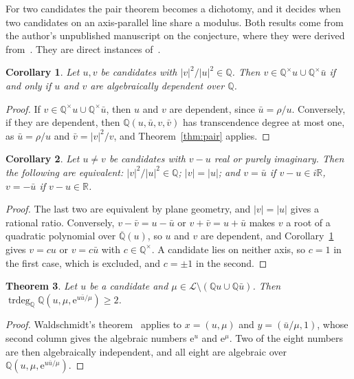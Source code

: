 \documentclass[11pt,a4paper]{article}
\theoremstyle{plain}
\newtheorem{theorem}{Theorem}[section]
\newtheorem{corollary}[theorem]{Corollary}
\theoremstyle{definition}
\newcommand{\e}{\mathrm{e}}
\newcommand{\Q}{\mathbb{Q}}
\newcommand{\R}{\mathbb{R}}
\newcommand{\Alg}{\overline{\mathbb{Q}}}
\newcommand{\Logs}{\mathcal{L}}
\DeclareMathOperator{\trdeg}{trdeg}
\begin{document}
For two candidates the pair theorem becomes a dichotomy, and it decides when two candidates on an
axis-parallel line share a modulus. Both results come from the author's unpublished manuscript on the
conjecture, where they were derived from~\cite[Th\'eor\`eme~0.2]{roy-waldschmidt-1997}. They are direct
instances of~\cite[Corollaire~4]{waldschmidt-1973}.

\begin{corollary}\label{cor:pair-dichotomy}
Let $u,v$ be candidates with $|v|^{2}/|u|^{2}\in\Q$. Then $v\in\Q^{\times}u\cup\Q^{\times}\bar u$ if and
only if $u$ and $v$ are algebraically dependent over $\Q$.
\end{corollary}

\begin{proof}
If $v\in\Q^{\times}u\cup\Q^{\times}\bar u$, then $u$ and $v$ are dependent, since $\bar u=\rho/u$.
Conversely, if they are dependent, then $\Q(u,\bar u,v,\bar v)$ has transcendence degree at most one,
as $\bar u=\rho/u$ and $\bar v=|v|^{2}/v$, and Theorem~\ref{thm:pair} applies.
\end{proof}

\begin{corollary}\label{cor:axis-ratio}
Let $u\neq v$ be candidates with $v-u$ real or purely imaginary. Then the following are equivalent:
$|v|^{2}/|u|^{2}\in\Q$; $|v|=|u|$; and $v=\bar u$ if $v-u\in i\R$, $v=-\bar u$ if $v-u\in\R$.
\end{corollary}

\begin{proof}
The last two are equivalent by plane geometry, and $|v|=|u|$ gives a rational ratio. Conversely,
$v-\bar v=u-\bar u$ or $v+\bar v=u+\bar u$ makes $v$ a root of a quadratic polynomial over $\Alg(u)$, so
$u$ and $v$ are dependent, and Corollary~\ref{cor:pair-dichotomy} gives $v=cu$ or $v=c\bar u$ with
$c\in\Q^{\times}$. A candidate lies on neither axis, so $c=1$ in the first case, which is excluded,
and $c=\pm1$ in the second.
\end{proof}

\begin{theorem}\label{thm:mixed-rigidity}
Let $u$ be a candidate and $\mu\in\Logs\setminus(\Q u\cup\Q\bar u)$. Then
$\trdeg_{\Q}\Q(u,\mu,\e^{u\bar u/\mu})\ge2$.
\end{theorem}

\begin{proof}
Waldschmidt's theorem~\cite{waldschmidt-1973} applies to $x=(u,\mu)$ and $y=(\bar u/\mu,1)$, whose
second column gives the algebraic numbers $\e^{u}$ and $\e^{\mu}$. Two of the eight numbers are then
algebraically independent, and all eight are algebraic over $\Q(u,\mu,\e^{u\bar u/\mu})$.
\end{proof}
\end{document}
